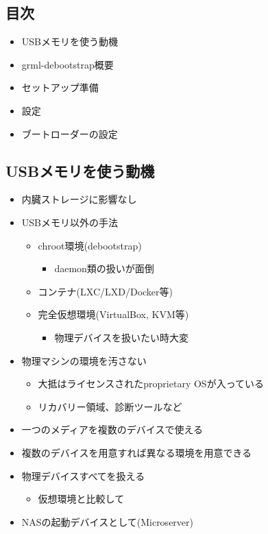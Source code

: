 \documentclass[mingoth,a4paper]{jsarticle}
\begin{document}
\subsection{目次}

  \begin{itemize}
  \item USBメモリを使う動機
  \item grml-debootstrap概要
  \item セットアップ準備
  \item 設定
  \item ブートローダーの設定
  \end{itemize}


\subsection{USBメモリを使う動機}

  \begin{itemize}
  \item 内臓ストレージに影響なし
  \item USBメモリ以外の手法
    \begin{itemize}
    \item chroot環境(debootstrap)
      \begin{itemize}
      \item daemon類の扱いが面倒
      \end{itemize}
    \item コンテナ(LXC/LXD/Docker等)
    \item 完全仮想環境(VirtualBox, KVM等)
      \begin{itemize}
      \item 物理デバイスを扱いたい時大変
      \end{itemize}
    \end{itemize}
  \end{itemize}


  \begin{itemize}
  \item 物理マシンの環境を汚さない
    \begin{itemize}
    \item 大抵はライセンスされたproprietary OSが入っている
    \item リカバリー領域、診断ツールなど
    \end{itemize}
  \item 一つのメディアを複数のデバイスで使える
  \item 複数のデバイスを用意すれば異なる環境を用意できる
  \item 物理デバイスすべてを扱える
    \begin{itemize}
    \item 仮想環境と比較して
    \end{itemize}
  \item NASの起動デバイスとして(Microserver)
  \end{itemize}
\end{document}
